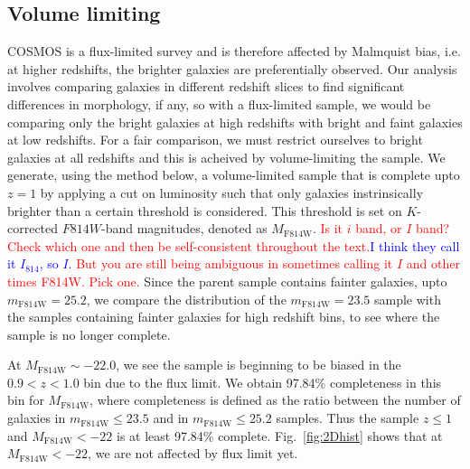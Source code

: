 \documentclass[twocolumn,useAMS,usenatbib]{mn2e}
\newcommand{\rachel}[1]{{\textcolor{red}{#1}}}
\newcommand{\arun}[1]{{\textcolor{blue}{#1}}}
\begin{document}
\subsection{Volume limiting}
\label{sub:volumelimiting}
COSMOS is a flux-limited survey and is therefore affected by Malmquist bias, i.e. at higher redshifts, the brighter galaxies are preferentially observed.
Our analysis involves comparing galaxies in different redshift slices to find significant differences in morphology, if any, so with a flux-limited sample, we would be comparing only the bright galaxies at high redshifts with
bright and faint galaxies at low redshifts. For a fair comparison, we must restrict ourselves to bright galaxies at all redshifts and this is acheived by volume-limiting the sample.
We generate, using the method below, a volume-limited sample that is complete upto $z=1$ by applying a cut on luminosity such that only galaxies instrinsically brighter than a certain threshold is considered. This threshold is set on $K$-corrected $F814W$-band magnitudes, denoted as $M_\text{F814W}$.
\rachel{Is it $i$ band, or $I$ band?  Check which one and then be
  self-consistent throughout the text.}\arun{I think they call it
  $I_{814}$, so $I$.}
\rachel{But you are still being ambiguous in sometimes calling it $I$
  and other times F814W.  Pick one.}
Since the parent sample contains fainter galaxies, upto $m_\text{F814W}=25.2$, we compare the distribution of the $m_\text{F814W}=23.5$ sample with the samples containing fainter galaxies for high redshift bins, to see where the sample is no longer complete.

At $M_\text{F814W}\sim-22.0$, we see the sample is beginning to be biased in the $0.9<z<1.0$ bin due to the flux limit. We obtain 97.84\% completeness in this bin for $M_\text{F814W}$, where completeness is defined as the ratio between the number of galaxies in $m_\text{F814W}\le 23.5$ and in $m_\text{F814W}\le25.2$ samples.
Thus the sample $z\le1$ and $M_\text{F814W}<-22$ is at least 97.84\% complete. Fig.~\ref{fig:2Dhist} shows that at $M_\text{F814W}<-22$, we are not affected by flux limit yet. 
\end{document}
